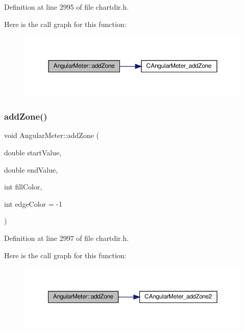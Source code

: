 Definition at line 2995 of file chartdir.\+h.

Here is the call graph for this function\+:
\nopagebreak
\begin{figure}[H]
\begin{center}
\leavevmode
\includegraphics[width=350pt]{class_angular_meter_ae1f9bf540c796aeb6df17698c0019224_cgraph}
\end{center}
\end{figure}
\mbox{\label{class_angular_meter_aab2b69fb54f0761d9a2b5c76088570f6}} 
\subsubsection{\texorpdfstring{add\+Zone()}{addZone()}\hspace{0.1cm}{\footnotesize\ttfamily [2/2]}}
{\footnotesize\ttfamily void Angular\+Meter\+::add\+Zone (\begin{DoxyParamCaption}\item[{double}]{start\+Value,  }\item[{double}]{end\+Value,  }\item[{int}]{fill\+Color,  }\item[{int}]{edge\+Color = {\ttfamily -\/1} }\end{DoxyParamCaption})\hspace{0.3cm}{\ttfamily [inline]}}



Definition at line 2997 of file chartdir.\+h.

Here is the call graph for this function\+:
\nopagebreak
\begin{figure}[H]
\begin{center}
\leavevmode
\includegraphics[width=350pt]{class_angular_meter_aab2b69fb54f0761d9a2b5c76088570f6_cgraph}
\end{center}
\end{figure}
\mbox{\label{class_angular_meter_a454bd094af77f76a8e1b55ce180a686c}} 
